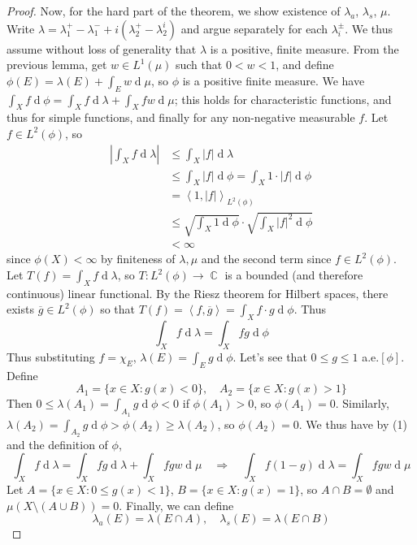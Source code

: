 \documentclass[12pt, a4paper]{book}
\DeclareMathOperator{\C}{\mathbb{C}}
\renewcommand{\d}[1]{\ensuremath{\operatorname{d}\!{#1}}} %
\newcommand{\inner}[2]{\left\langle #1, #2 \right\rangle} %
\newcommand{\imp}{\ensuremath{\quad\Longrightarrow\quad}}
\theoremstyle{nonumberplain}
\newtheorem{proof}{Proof}
\begin{document}
\begin{proof}
    Now, for the hard part of the theorem, we show existence of $\lambda_a$, $\lambda_s$, $\mu$.
    Write $\lambda=\lambda_1^+-\lambda_1^-+i(\lambda_2^+-\lambda_2^i)$ and argue separately for each $\lambda_i^\pm$.
    We thus assume without loss of generality that $\lambda$ is a positive, finite measure.
    From the previous lemma, get $w\in L^1(\mu)$ such that $0<w<1$, and define $\phi(E)=\lambda(E)+\int_E w\d{\mu}$, so $\phi$ is a positive finite measure.
    We have $\int_X f\d{\phi}=\int_X f\d{\lambda}+\int_X fw\d{\mu}$; this holds for characteristic functions, and thus for simple functions, and finally for any non-negative measurable $f$.
    Let $f\in L^2(\phi)$, so
    \begin{align*}
        \left\lvert \int_X f\d{\lambda}\right\rvert &\leq \int_X|f|\d{\lambda}\\
                                                    &\leq\int_X|f|\d{\phi}=\int_X 1\cdot|f|\d{\phi}\\
                                                    &= \inner{1}{|f|}_{L^2(\phi)}\\
                                                    &\leq\sqrt{\int_X 1\d{\phi}}\cdot\sqrt{\int_X|f|^2\d{\phi}}\\
                                                    &<\infty
    \end{align*}
    since $\phi(X)<\infty$ by finiteness of $\lambda,\mu$ and the second term since $f\in L^2(\phi)$.
    Let $T(f)=\int_X f\d{\lambda}$, so $T:L^2(\phi)\to\C$ is a bounded (and therefore continuous) linear functional.
    By the Riesz theorem for Hilbert spaces, there exists $\overline{g}\in L^2(\phi)$ so that $T(f)=\inner{f}{\overline{g}}=\int_Xf\cdot g\d{\phi}$.
    Thus
    \begin{equation*}\int_X f\d{\lambda}=\int_X fg\d{\phi}\tag{1}\end{equation*}
    Thus substituting $f=\chi_E$, $\lambda(E)=\int_E g\d{\phi}$.
    Let's see that $0\leq g\leq 1$ a.e.$[\phi]$.
    Define
    \[A_1=\{x\in X:g(x)<0\},\quad A_2=\{x\in X:g(x)>1\}\]
    Then $0\leq \lambda(A_1)=\int_{A_1}g\d{\phi}<0$ if $\phi(A_1)>0$, so $\phi(A_1)=0$.
    Similarly, $\lambda(A_2)=\int_{A_2}g\d{\phi}>\phi(A_2)\geq\lambda(A_2)$, so $\phi(A_2)=0$.
    We thus have by (1) and the definition of $\phi$,
    \begin{equation*}\int_X f\d{\lambda}=\int_X fg\d{\lambda}+\int_X fgw\d{\mu}\imp\int_X f(1-g)\d{\lambda}=\int_X fgw\d{\mu}\tag{2}\end{equation*}
    Let $A=\{x\in X:0\leq g(x)<1\}$, $B=\{x\in X:g(x)=1\}$, so $A\cap B=\emptyset$ and $\mu(X\setminus(A\cup B))=0$.
    Finally, we can define
    \[\lambda_a(E)=\lambda(E\cap A),\quad\lambda_s(E)=\lambda(E\cap B)\]


\end{proof}
\end{document}
